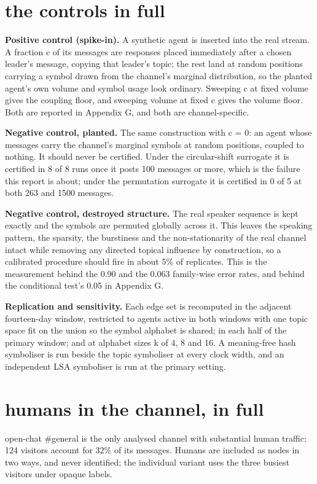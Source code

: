 \documentclass[11pt]{article}
\begin{document}
\section{the controls in full}

\textbf{Positive control (spike-in).} A synthetic agent is inserted into the real stream. A fraction c of its messages are responses placed immediately after a chosen leader's message, copying that leader's topic; the rest land at random positions carrying a symbol drawn from the channel's marginal distribution, so the planted agent's own volume and symbol usage look ordinary. Sweeping c at fixed volume gives the coupling floor, and sweeping volume at fixed c gives the volume floor. Both are reported in Appendix G, and both are channel-specific.

\textbf{Negative control, planted.} The same construction with c = 0: an agent whose messages carry the channel's marginal symbols at random positions, coupled to nothing. It should never be certified. Under the circular-shift surrogate it is certified in 8 of 8 runs once it posts 100 messages or more, which is the failure this report is about; under the permutation surrogate it is certified in 0 of 5 at both 263 and 1500 messages.

\textbf{Negative control, destroyed structure.} The real speaker sequence is kept exactly and the symbols are permuted globally across it. This leaves the speaking pattern, the sparsity, the burstiness and the non-stationarity of the real channel intact while removing any directed topical influence by construction, so a calibrated procedure should fire in about 5\% of replicates. This is the measurement behind the 0.90 and the 0.063 family-wise error rates, and behind the conditional test's 0.05 in Appendix G.

\textbf{Replication and sensitivity.} Each edge set is recomputed in the adjacent fourteen-day window, restricted to agents active in both windows with one topic space fit on the union so the symbol alphabet is shared; in each half of the primary window; and at alphabet sizes k of 4, 8 and 16. A meaning-free hash symboliser is run beside the topic symboliser at every clock width, and an independent LSA symboliser is run at the primary setting.

\section{humans in the channel, in full}

open-chat \#general is the only analysed channel with substantial human traffic: 124 visitors account for 32\% of its messages. Humans are included as nodes in two ways, and never identified; the individual variant uses the three busiest visitors under opaque labels.
\end{document}
